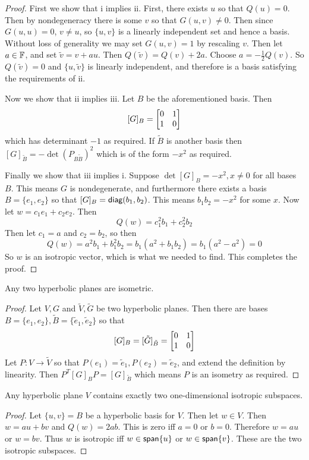 \begin{proof}
    First we show that i implies ii. First, there exists $u$ so that $Q(u)=0$. Then by nondegeneracy there is some $v$ so that $G(u,v)\neq 0$. Then since $G(u,u)=0$, $v\neq u$, so $\{u,v\}$ is a linearly independent set and hence a basis. Without loss of generality we may set $G(u,v)=1$ by rescaling $v$. Then let $a \in \operatorname{\mathbb{F}}$, and set $\tilde{v} = v+au$. Then $Q(\tilde{v}) = Q(v)+2a$. Choose $a = -\frac{1}{2}Q(v)$. So $Q(\tilde{v})=0$ and $\{u,\tilde{v}\}$ is linearly independent, and therefore is a basis satisfying the requirements of ii.

    Now we show that ii implies iii. Let $B$ be the aforementioned basis. Then 
    \[[G]_B = \begin{bmatrix}0&1\\1&0\end{bmatrix}\]
    which has determinant $-1$ as required. If $\tilde{B}$ is another basis then $[G]_{\tilde{B}} = -\det(P_{B\tilde{B}})^2$ which is of the form $-x^2$ as required.

    Finally we show that iii implies i. Suppose $\det [G]_B = -x^2,x\neq0$ for all bases $B$. This means $G$ is nondegenerate, and furthermore there exists a basis $B=\{e_1,e_2\}$ so that $[G]_B = \operatorname{\textsf{diag}}(b_1,b_2)$. This means $b_1b_2 = -x^2$ for some $x$. Now let $w = c_1 e_1 + c_2 e_2$. Then \[Q(w) = c_1^2 b_1 + c_2^2 b_2\]
    Then let $c_1 = a$ and $c_2 = b_2$, so then 
    \[Q(w) = a^2 b_1 + b_1^2 b_2 = b_1(a^2+b_1b_2)=b_1(a^2-a^2)=0\]
    So $w$ is an isotropic vector, which is what we needed to find. This completes the proof.
\end{proof}
\begin{cor}
    Any two hyperbolic planes are isometric.
\end{cor}
\begin{proof}
    Let $V,G$ and $\tilde{V},\tilde{G}$ be two hyperbolic planes. Then there are bases $B=\{e_1,e_2\},\tilde{B}=\{\tilde{e}_1,\tilde{e}_2\}$ so that \[[G]_B = [\tilde{G}]_{\tilde{B}} = \begin{bmatrix}0&1\\1&0\end{bmatrix}\]
    Let $P : V\to \tilde{V}$ so that $P(e_1)=\tilde{e}_1,P(e_2)=\tilde{e}_2$, and extend the definition by linearity. Then $P^T [G]_B P = [G]_{\tilde{B}}$ which means $P$ is an isometry as required.
\end{proof}
\begin{thm}
    Any hyperbolic plane $V$ contains exactly two one-dimensional isotropic subspaces.
\end{thm}
\begin{proof}
    Let $\{u,v\}=B$ be a hyperbolic basis for $V$. Then let $w \in V$. Then $w = au+bv$ and $Q(w)=2ab$. This is zero iff $a=0$ or $b=0$. Therefore $w=au$ or $w=bv$. Thus $w$ is isotropic iff $w \in \operatorname{\textsf{span}}\{u\}$ or $w\in \operatorname{\textsf{span}}\{v\}$. These are the two isotropic subspaces.
\end{proof}
